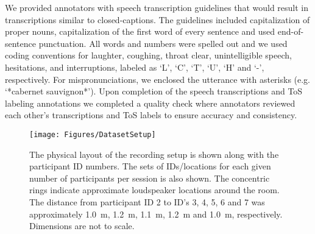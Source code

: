 \documentclass[journal]{IEEEtran}
\begin{document}
We provided annotators with speech transcription guidelines that would result in transcriptions similar to closed-captions.
The guidelines included capitalization of proper nouns, capitalization of the first word of every sentence and used end-of-sentence punctuation.
All words and numbers were spelled out and we used coding conventions for laughter, coughing, throat clear, unintelligible speech, hesitations, and interruptions, labeled as `L', `C', `T', `U', `H' and `-', respectively.
For mispronunciations, we enclosed the utterance with asterisks (e.g. `*cabernet sauvignon*').
Upon completion of the speech transcriptions and ToS labeling annotations we completed a quality check where annotators reviewed each other's transcriptions and ToS labels to ensure accuracy and consistency.




\begin{figure}
    \centering
    \texttt{[image: Figures/DatasetSetup]}
    \caption{
        The physical layout of the recording setup is shown along with the participant ID numbers.
        The sets of IDs/locations for each given number of participants per session is also shown.
        The concentric rings indicate approximate loudspeaker locations around the room.
        The distance from participant ID 2 to ID's 3, 4, 5, 6 and 7 was approximately \SI{1.0}{\meter}, \SI{1.2}{\meter}, \SI{1.1}{\meter}, \SI{1.2}{\meter} and \SI{1.0}{\meter}, respectively.
        Dimensions are not to scale.}
    \label{fig:Dataset_Setup}
\end{figure}
\end{document}
